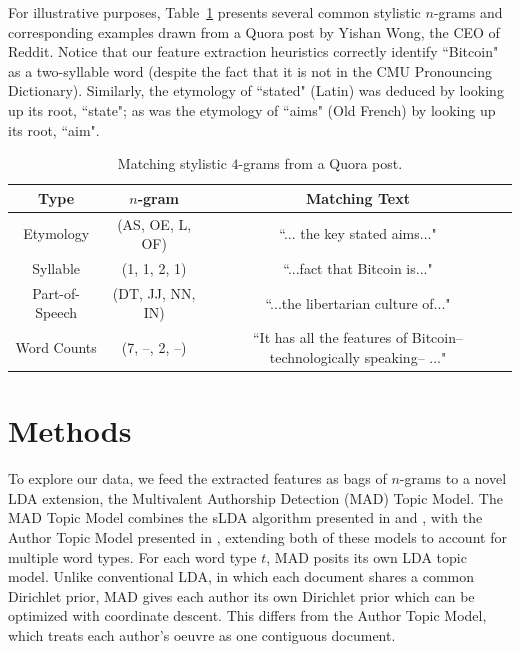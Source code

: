 \documentclass[14pt]{article} %
\theoremstyle{plain}
\theoremstyle{definition}
\theoremstyle{remark}
\begin{document}
For illustrative purposes, Table~\ref{tab:sample_ngrams} presents several common stylistic $n$-grams and corresponding examples drawn from a Quora post by Yishan Wong, the CEO of Reddit. Notice that our feature extraction heuristics correctly identify ``Bitcoin" as a two-syllable word (despite the fact that it is not in the CMU Pronouncing Dictionary). Similarly, the etymology of ``stated" (Latin) was deduced by looking up its root, ``state"; as was the etymology of ``aims" (Old French) by looking up its root, ``aim".

\begin{table}[ht] 
\centering
\begin{tabular}{ c | c | c }
  Type & $n$-gram & Matching Text \\
  \hline
  Etymology & (AS, OE, L, OF) & ``... the key stated aims..." \\
  Syllable & (1, 1, 2, 1) & ``...fact that Bitcoin is..." \\
  Part-of-Speech & (DT, JJ, NN, IN) & ``...the libertarian culture of..." \\
  Word Counts & (7, --, 2, --) & ``It has all the features of Bitcoin--technologically speaking-- ..."
\end{tabular}
\caption{Matching stylistic $4$-grams from a Quora post.}
\label{tab:sample_ngrams}
\end{table}

\section{Methods}

To explore our data, we feed the extracted features as bags of $n$-grams to a novel LDA extension, the Multivalent Authorship Detection (MAD) Topic Model. The MAD Topic Model combines the sLDA algorithm presented in \cite{wang2009simultaneous} and \cite{Blei2007}, with the Author Topic Model presented in \cite{rosen2004author}, extending both of these models to account for multiple word types.  For each word type $t$, MAD posits its own LDA topic model. Unlike conventional LDA, in which each document shares a common Dirichlet prior, MAD gives each author its own Dirichlet prior which can be optimized with coordinate descent. This differs from the Author Topic Model, which treats each author's oeuvre as one contiguous document.
\end{document}

